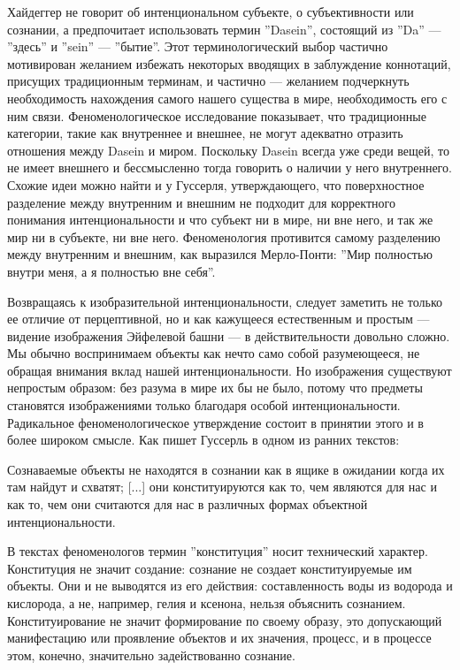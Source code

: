 \documentclass[11pt]{book}
\begin{document}
\relax
{}\relax
\smallskip

Хайдеггер не говорит об интенциональном субъекте, о субъективности или сознании, а предпочитает использовать термин ''Dasein'', состоящий из ''Da'' --- ''здесь'' и ''sein'' --- ''бытие''. Этот терминологический выбор частично мотивирован желанием избежать некоторых вводящих в заблуждение коннотаций, присущих традиционным терминам, и частично --- желанием подчеркнуть необходимость нахождения самого нашего существа в мире, необходимость его с ним связи. Феноменологическое исследование показывает, что традиционные категории, такие как внутреннее и внешнее, не могут адекватно отразить отношения между Dasein и миром. Поскольку Dasein всегда уже среди вещей, то не имеет внешнего и бессмысленно тогда говорить о наличии у него внутреннего. Схожие идеи можно найти и у Гуссерля, утверждающего, что поверхностное разделение между внутренним и внешним не подходит для корректного понимания интенциональности и что субъект ни в мире, ни вне него, и так же мир ни в субъекте, ни вне него. Феноменология противится самому разделению между внутренним и внешним, как выразился Мерло-Понти: ''Мир полностью внутри меня, а я полностью вне себя''.

Возвращаясь к изобразительной интенциональности, следует заметить не только ее отличие от перцептивной, но и как кажущееся естественным и простым --- видение изображения Эйфелевой башни --- в действительности довольно сложно. Мы обычно воспринимаем объекты как нечто само собой разумеющееся, не обращая внимания вклад нашей интенциональности. Но изображения существуют непростым образом: без разума в мире их бы не было, потому что предметы становятся изображениями только благодаря особой интенциональности. Радикальное феноменологическое утверждение состоит в принятии этого и в более широком смысле. Как пишет Гуссерль в одном из ранних текстов:

\smallskip
{}\relax
{}\relax

Сознаваемые объекты не находятся в сознании как в ящике в ожидании когда их там найдут и схватят; [...] они конституируются как то, чем являются для нас и как то, чем они считаются для нас в различных формах объектной интенциональности.

\relax
{}\relax
\smallskip

В текстах феноменологов термин ''конституция'' носит технический характер. Конституция не значит создание: сознание не создает конституируемые им объекты. Они и не выводятся из его действия: составленность воды из водорода и кислорода, а не, например, гелия и ксенона, нельзя объяснить сознанием. Конституирование не значит формирование по своему образу, это допускающий манифестацию или проявление объектов и их значения, процесс, и в процессе этом, конечно, значительно задействованно сознание.
\end{document}
